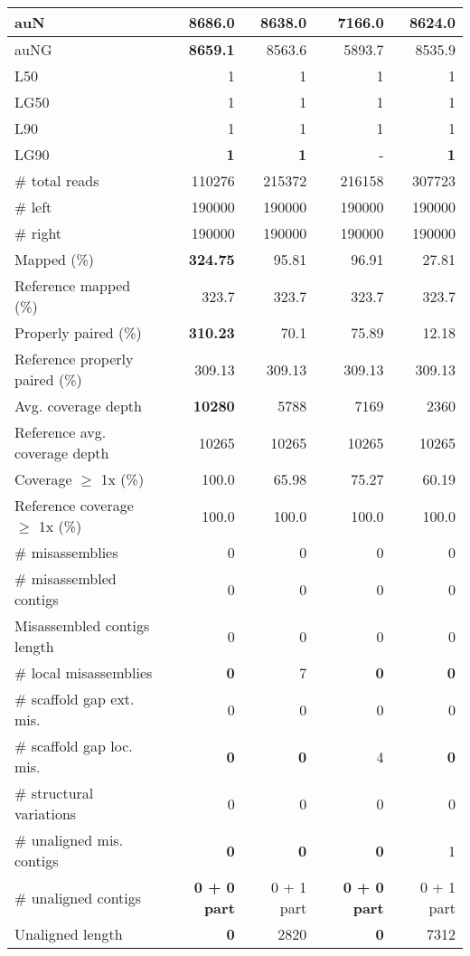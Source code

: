 \documentclass[12pt,a4paper]{article}
\begin{document}
\begin{table}[ht]
\begin{center}
\begin{tabular}{|l*{4}{|r}|}
auN & {\bf 8686.0} & 8638.0 & 7166.0 & 8624.0 \\ \hline
auNG & {\bf 8659.1} & 8563.6 & 5893.7 & 8535.9 \\ \hline
L50 & 1 & 1 & 1 & 1 \\ \hline
LG50 & 1 & 1 & 1 & 1 \\ \hline
L90 & 1 & 1 & 1 & 1 \\ \hline
LG90 & {\bf 1} & {\bf 1} & - & {\bf 1} \\ \hline
\# total reads & 110276 & 215372 & 216158 & 307723 \\ \hline
\# left & 190000 & 190000 & 190000 & 190000 \\ \hline
\# right & 190000 & 190000 & 190000 & 190000 \\ \hline
Mapped (\%) & {\bf 324.75} & 95.81 & 96.91 & 27.81 \\ \hline
Reference mapped (\%) & 323.7 & 323.7 & 323.7 & 323.7 \\ \hline
Properly paired (\%) & {\bf 310.23} & 70.1 & 75.89 & 12.18 \\ \hline
Reference properly paired (\%) & 309.13 & 309.13 & 309.13 & 309.13 \\ \hline
Avg. coverage depth & {\bf 10280} & 5788 & 7169 & 2360 \\ \hline
Reference avg. coverage depth & 10265 & 10265 & 10265 & 10265 \\ \hline
Coverage $\geq$ 1x (\%) & 100.0 & 65.98 & 75.27 & 60.19 \\ \hline
Reference coverage $\geq$ 1x (\%) & 100.0 & 100.0 & 100.0 & 100.0 \\ \hline
\# misassemblies & 0 & 0 & 0 & 0 \\ \hline
\# misassembled contigs & 0 & 0 & 0 & 0 \\ \hline
Misassembled contigs length & 0 & 0 & 0 & 0 \\ \hline
\# local misassemblies & {\bf 0} & 7 & {\bf 0} & {\bf 0} \\ \hline
\# scaffold gap ext. mis. & 0 & 0 & 0 & 0 \\ \hline
\# scaffold gap loc. mis. & {\bf 0} & {\bf 0} & 4 & {\bf 0} \\ \hline
\# structural variations & 0 & 0 & 0 & 0 \\ \hline
\# unaligned mis. contigs & {\bf 0} & {\bf 0} & {\bf 0} & 1 \\ \hline
\# unaligned contigs & {\bf 0 + 0 part} & 0 + 1 part & {\bf 0 + 0 part} & 0 + 1 part \\ \hline
Unaligned length & {\bf 0} & 2820 & {\bf 0} & 7312 \\ \hline

\end{tabular}
\end{center}
\end{table}
\end{document}
